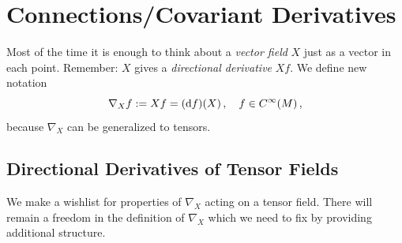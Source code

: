 \documentclass[11pt, a4paper, twocolumn]{article} %
\begin{document}
\section{Connections/Covariant Derivatives}
Most of the time it is enough to think about a \textit{vector field} $X$ just as a vector in each point.
Remember: $X$ gives a \textit{directional derivative} $Xf$.
We define new notation
\begin{equation}
    \nabla_X f := Xf = (\operatorname{d\!} f)(X)\,,\quad f\in C^\infty(M)\,,
\end{equation}
because $\nabla_X$ can be generalized to tensors.

\subsection{Directional Derivatives of Tensor Fields}
We make a wishlist for  properties of $\nabla_X$ acting on a tensor field.
There will remain a freedom in the definition of $\nabla_X$ which we need
to fix by providing additional structure.
\end{document}
